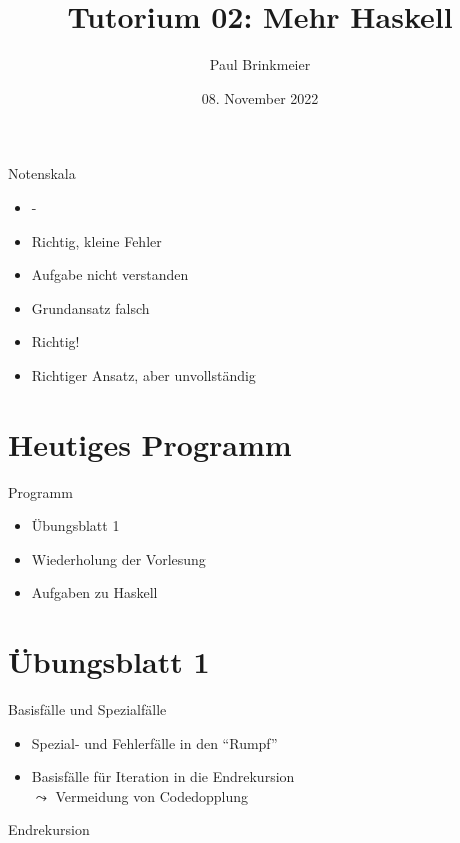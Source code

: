 \documentclass{beamer}
\title{Tutorium 02: Mehr Haskell}
\author{Paul Brinkmeier}
\institute{Tutorium Programmierparadigmen am KIT}
\date{08. November 2022}
\begin{document}
\begin{frame}
	\titlepage
\end{frame}

\begin{frame}{Notenskala}
	\begin{itemize}
		\item -
		\item Richtig, kleine Fehler
		\item Aufgabe nicht verstanden
		\item Grundansatz falsch
		\item Richtig!
		\item Richtiger Ansatz, aber unvollständig
	\end{itemize}
\end{frame}

\section{Heutiges Programm}
\begin{frame}{Programm}
	\begin{itemize}
		\item Übungsblatt 1
		\item Wiederholung der Vorlesung
		\item Aufgaben zu Haskell
	\end{itemize}
\end{frame}

\section{Übungsblatt 1}

\begin{frame}{Basisfälle und Spezialfälle}

	\begin{itemize}
		\item Spezial- und Fehlerfälle in den \enquote{Rumpf}
		\item Basisfälle für Iteration in die Endrekursion\\
			  $\leadsto$ Vermeidung von Codedopplung
	\end{itemize}
\end{frame}

\begin{frame}{Endrekursion}
\end{frame}
\end{document}
